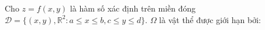 \documentclass[preview]{standalone}
\begin{document}
\parbox{6cm}{Cho $z = f(x, y)$ là hàm số xác định trên miền đóng $\mathcal{D} = \{(x,y), \mathbb{R}^2 : a \leq x \leq b, c \leq y \leq d\}$. $\Omega$ là vật thể được giới hạn bởi:\\}
\end{document}
